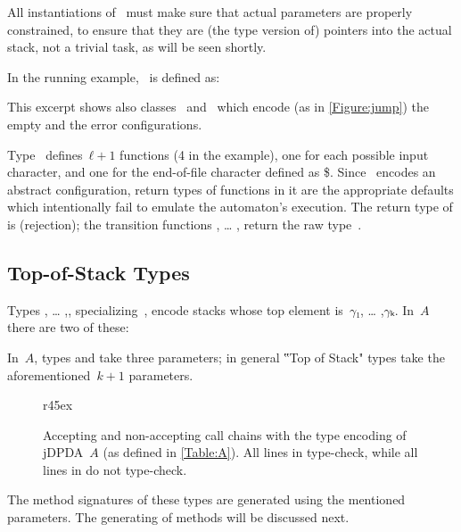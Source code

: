 All instantiations of~ must make sure that actual parameters are properly constrained,
  to ensure that they are (the type version of) pointers into the actual stack,
  not a trivial task, as will be seen shortly.

In the running example,~ is defined as:
\begin{quote}
\end{quote}
This excerpt shows also classes~ and~ which encode (as in \cref{Figure:jump})
  the empty and the error configurations.

Type~ defines~$ℓ+1$ functions (4 in the example), one for each possible input character,
  and one for the end-of-file character defined as \$.
Since~ encodes an abstract configuration, return types of functions in it
  are the appropriate defaults which intentionally fail to emulate the automaton's execution.
  The return type of \cc{\$()} is  (rejection);
  the transition functions , … , return the raw type~.

\subsection{Top-of-Stack Types}

Types , … ,, specializing~,
  encode stacks whose top element is~$γ₁$, … ,$γₖ$.
In~$A$ there are two of these:
\begin{quote}
\end{quote}

In~$A$, types  and  take three parameters;
in general ‟Top of Stack" types take the aforementioned~$k+1$ parameters.

\begin{wrapfigure}[14]r{45ex}
  \caption[Use examples of the type encoding of the jDPDA]{\label{Figure:chain} Accepting and non-accepting call chains with the
  type encoding of jDPDA~$A$ (as defined in \cref{Table:A}).
  All lines in  type-check, while all lines in  do not type-check.}
\end{wrapfigure}

The method signatures of these types are generated using the mentioned parameters.
The generating of methods will be discussed next.

